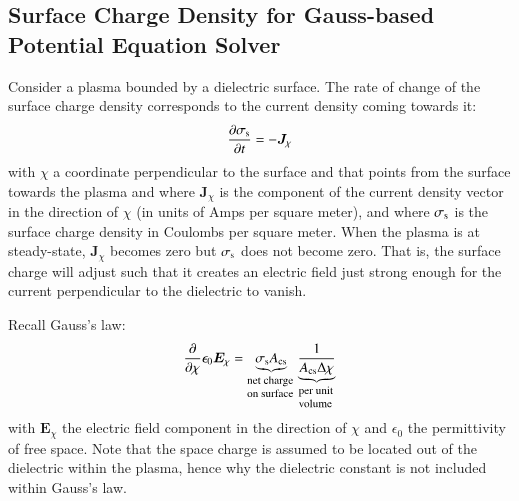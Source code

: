 \documentclass{warpdoc}
\renewcommand{\vec}[1]{\bm{#1}}
\begin{document}
\subsection{Surface Charge Density for Gauss-based Potential Equation Solver}

Consider a plasma bounded by a dielectric surface. The rate of change of the surface charge density corresponds to the current density coming towards it:
%
\begin{equation}
  \frac{\partial \sigma_{\rm s}}{\partial t} = -\vec{J}_{\chi}  
\label{eqn:dsigmasdt}
\end{equation}
%
with $\chi$ a coordinate perpendicular to the surface and that points from the surface towards the plasma and where 
 $\vec{J}_\chi$ is the component of the current density vector in the direction of $\chi$ (in units of Amps per square meter), and where $\sigma_{\rm s}$ is the surface charge density in Coulombs per square meter. When the plasma is at steady-state, $\vec{J}_\chi$ becomes zero but $\sigma_{\rm s}$ does not become zero. That is, the surface charge will adjust such that it creates an electric field just strong enough for the current perpendicular to the dielectric to vanish. 

Recall Gauss's law:
%
\begin{equation}
  \frac{\partial }{\partial \chi} \epsilon_0 \vec{E}_\chi = \underbrace{\sigma_{\rm s} A_{\rm cs}}_{\begin{minipage}{0.1\textwidth}\footnotesize\flushleft net charge on surface\end{minipage}} \underbrace{\frac{1}{A_{\rm cs} \Delta \chi}}_{\begin{minipage}{0.075\textwidth}\footnotesize\flushleft per unit volume\end{minipage}} 
\end{equation}
% 
with $\vec{E}_\chi$ the electric field component in the direction of $\chi$ and $\epsilon_0$ the permittivity of free space. Note that the space charge is assumed to be located out of the dielectric within the plasma, hence why the dielectric constant is not included within Gauss's law.
\end{document}
